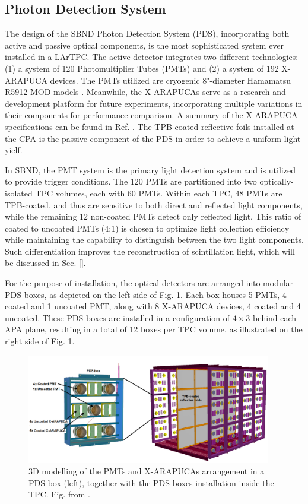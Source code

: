 \subsection{Photon Detection System}
\label{sec:sbnd_pds}

The design of the SBND Photon Detection System (PDS), incorporating both active and passive optical components, is the most sophisticated system ever installed in a LArTPC. 
The active detector integrates two different technologies: (1) a system of 120 Photomultiplier Tubes (PMTs) and (2) a system of 192 X-ARAPUCA devices.
The PMTs utilized are cryogenic 8"-diameter Hamamatsu R5912-MOD models \cite{hamamatsu}. 
Meanwhile, the X-ARAPUCAs serve as a research and development platform for future experiments, incorporating multiple variations in their components for performance comparison. 
A summary of the X-ARAPUCA specifications can be found in Ref. \cite{}.
The TPB-coated reflective foils installed at the CPA is the passive component of the PDS in order to achieve a uniform light yielf.

In SBND, the PMT system is the primary light detection system and is utilized to provide trigger conditions. 
The 120 PMTs are partitioned into two optically-isolated TPC volumes, each with 60 PMTs.
Within each TPC, 48 PMTs are TPB-coated, and thus are sensitive to both direct and reflected light components, while the remaining 12 non-coated PMTs detect only reflected light. 
This ratio of coated to uncoated PMTs (4:1) is chosen to optimize light collection efficiency while maintaining the capability to distinguish between the two light components. 
Such differentiation improves the reconstruction of scintillation light, which will be discussed in Sec. \ref{}.

For the purpose of installation, the optical detectors are arranged into modular PDS boxes, as depicted on the left side of Fig. \ref{fig:SBND_PDS}. 
Each box houses 5 PMTs, 4 coated and 1 uncoated PMT, along with 8 X-ARAPUCA devices, 4 coated and 4 uncoated.
These PDS-boxes are installed in a configuration of $4 \times 3$ behind each APA plane, resulting in a total of 12 boxes per TPC volume, as illustrated on the right side of Fig. \ref{fig:SBND_PDS}.

\begin{figure}[hbp]
\centering    
\includegraphics[width=0.95\textwidth]{SBND_PDS}
\caption[SBND_PDS]{
3D modelling of the PMTs and X-ARAPUCAs arrangement in a PDS box (left), together with the PDS boxes installation inside the TPC.
Fig. from \cite{}.
}
\label{fig:SBND_PDS}
\end{figure}

